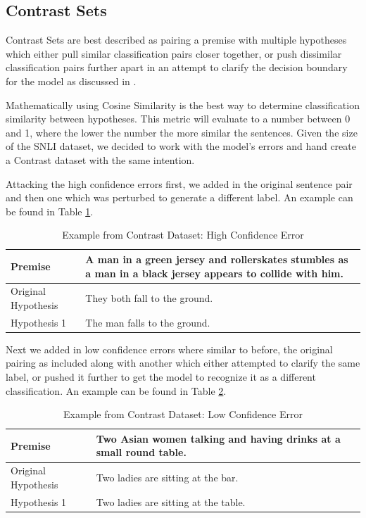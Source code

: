 \documentclass[11pt]{article}
\begin{document}
\subsection{Contrast Sets}
Contrast Sets are best described as pairing a premise with multiple hypotheses which either pull similar classification pairs closer together, or push dissimilar classification pairs further apart in an attempt to clarify the decision boundary for the model as discussed in \citealp{sanwal2024evaluatinglargelanguagemodels}.

Mathematically using Cosine Similarity is the best way to determine classification similarity between hypotheses. This metric will evaluate to a number between 0 and 1, where the lower the number the more similar the sentences.  Given the size of the SNLI dataset, we decided to work with the model's errors and hand create a Contrast dataset with the same intention.

Attacking the high confidence errors first, we added in the original sentence pair and then one which was perturbed to generate a different label. An example can be found in Table \ref{tab:Annot1}.
\begin{table}[h!]
    \centering
    \begin{tabularx}{0.45\textwidth} { 
  | >{\raggedright\arraybackslash}X 
  | >{\raggedright\arraybackslash}X | }
    \hline
        Premise & A man in a green jersey and rollerskates stumbles as a man in a black jersey appears to collide with him.\\
        \hline
        Original Hypothesis & They both fall to the ground.\\
        \hline
        Hypothesis 1 & The man falls to the ground.\\
        \hline
    \end{tabularx}
    \caption{Example from Contrast Dataset: High Confidence Error}
    \label{tab:Annot1}
\end{table}

Next we added in low confidence errors where similar to before, the original pairing as included along with another which either attempted to clarify the same label, or pushed it further to get the model to recognize it as a different classification. An example can be found in Table \ref{tab:Annot2}.
\begin{table}[h!]
    \centering
    \begin{tabularx}{0.45\textwidth} { 
  | >{\raggedright\arraybackslash}X 
  | >{\raggedright\arraybackslash}X | }
    \hline
        Premise & Two Asian women talking and having drinks at a small round table.\\
        \hline
        Original Hypothesis & Two ladies are sitting at the bar.\\
        \hline
        Hypothesis 1 & Two ladies are sitting at the table.\\
        \hline
    \end{tabularx}
    \caption{Example from Contrast Dataset: Low Confidence Error}
    \label{tab:Annot2}
\end{table}
\end{document}

